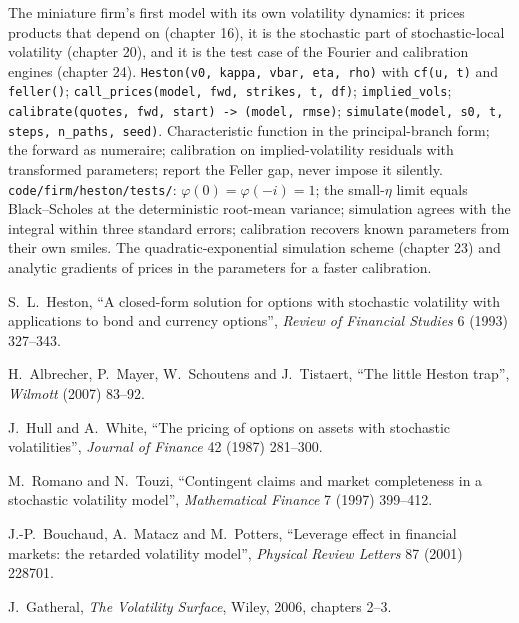 \begin{build}
 The miniature firm's first model with its own volatility dynamics: it prices products that
depend on  (chapter 16), it is the stochastic part of stochastic-local volatility (chapter 20),
and it is the test case of the Fourier and calibration engines (chapter 24).
 \texttt{Heston(v0, kappa, vbar, eta, rho)} with \texttt{cf(u, t)} and \texttt{feller()};
\texttt{call\_prices(model, fwd, strikes, t, df)}; \texttt{implied\_vols}; \texttt{calibrate(quotes, fwd,
start) -> (model, rmse)}; \texttt{simulate(model, s0, t, steps, n\_paths, seed)}.
 Characteristic function in the principal-branch form; the forward as numeraire; calibration on
implied-volatility residuals with transformed parameters; report the Feller gap, never impose it silently.
 \texttt{code/firm/heston/tests/}: $\varphi(0)=\varphi(-i)=1$; the small-$\eta$ limit
equals Black--Scholes at the deterministic root-mean variance; simulation agrees with the integral within
three standard errors; calibration recovers known parameters from their own smiles.
 The quadratic-exponential simulation scheme (chapter 23) and analytic gradients of prices in the
parameters for a faster calibration.
\end{build}

\begin{omsources}
\item S.~L.~Heston, ``A closed-form solution for options with stochastic volatility with applications to bond
and currency options'', \emph{Review of Financial Studies} 6 (1993) 327--343.
\item H.~Albrecher, P.~Mayer, W.~Schoutens and J.~Tistaert, ``The little Heston trap'', \emph{Wilmott} (2007)
83--92.
\item J.~Hull and A.~White, ``The pricing of options on assets with stochastic volatilities'', \emph{Journal of
Finance} 42 (1987) 281--300.
\item M.~Romano and N.~Touzi, ``Contingent claims and market completeness in a stochastic volatility model'',
\emph{Mathematical Finance} 7 (1997) 399--412.
\item J.-P.~Bouchaud, A.~Matacz and M.~Potters, ``Leverage effect in financial markets: the retarded
volatility model'', \emph{Physical Review Letters} 87 (2001) 228701.
\item J.~Gatheral, \emph{The Volatility Surface}, Wiley, 2006, chapters 2--3.
\end{omsources}

